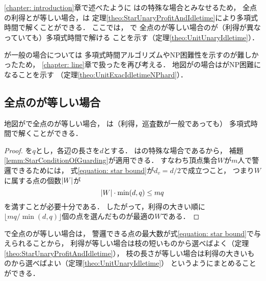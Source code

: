 \chapter{{\graphUnit}}
\label{chapter: unit}

\ref{chapter: introduction}章で述べたように
{\graphUnit}は{\graphStar}の特殊な場合とみなせるため，
全点の利得と{\maxIdletime}が等しい場合，{\patProb}は
定理\ref{theo:StarUnaryProfitAndIdletime}により多項式時間で解くことができる．
ここでは，
{\graphUnit}で
全点の{\maxIdletime}が等しい場合の{\patProb}が（利得が異なっていても）多項式時間で解ける
ことを示す（定理\ref{theo:UnitUnaryIdletime}）．

{\maxIdletime}が一般の場合については
多項式時間アルゴリズムやNP困難性を示すのが難しかったため，
\ref{chapter: line}章で扱った{\timeSpecifiedPatProb}を再び考える．
地図が{\graphUnit}の場合は{\timeSpecifiedPatProb}がNP困難になることを示す
（定理\ref{theo:UnitExacIdletimeNPhard}）．



\section{全点の{\maxIdletime}が等しい場合}
\label{section: UnitUnaryIdletime}

\begin{theo}
  \label{theo:UnitUnaryIdletime}
  地図が{\graphUnit}で全点の{\maxIdletime}が等しい場合，
  {\patProb}は（利得，巡査数が一般であっても）
  多項式時間で解くことができる．
\end{theo}

\begin{proof}
  {\maxIdletime}を$q$とし，各辺の長さを$d$とする．
  {\graphUnit}は{\graphStar}の特殊な場合であるから，
  補題\ref{lemm:StarConditionOfGuarding}が適用できる．
  すなわち頂点集合$W$が$m$人で警邏できるためには，
  式\eqref{equation: star bound}が$d _v = d / 2$で成立つこと，
  つまり$W$に属する点の個数$\lvert{W}\rvert$が
  \begin{equation}
    \lvert{W}\rvert \cdot \min (d, q) \leq m q
  \end{equation}
  を満すことが必要十分である．
  したがって，利得の大きい順に
  $\lfloor m q / \min (d, q) \rfloor$個の点を選んだものが最適の$W$である．
\end{proof}

{\graphStar}で全点の{\maxIdletime}が等しい場合は，
警邏できる点の最大数が式\eqref{equation: star bound}で与えられることから，
利得が等しい場合は枝の短いものから選べばよく（定理\ref{theo:StarUnaryProfitAndIdletime}），
枝の長さが等しい場合は利得の大きいものから選べばよい（定理\ref{theo:UnitUnaryIdletime}）
というようにまとめることができる．



